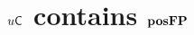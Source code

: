 \documentclass{lmcs}
\begin{document}
%
%
%
%

%
%





\section{$u \mathsf{C}$ contains $\mathbf{pos}\mathbf{FP}$}
\label{sect:unicob-contains-posfp}
\end{document}
